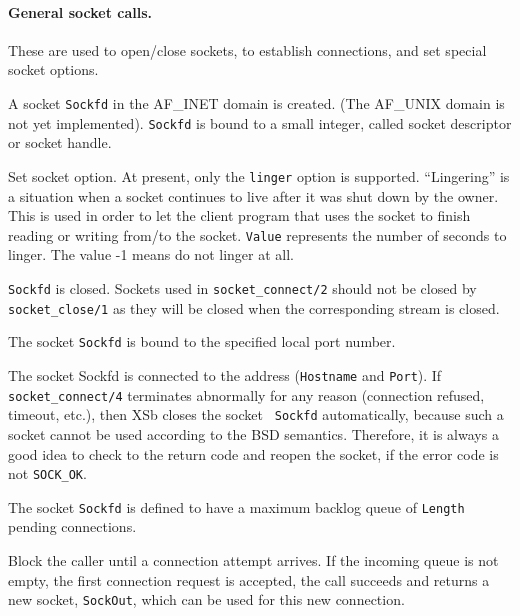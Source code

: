 \paragraph{General socket calls.}
These are used to open/close sockets, to establish connections, and set
special socket options.
\begin{description}
    A socket {\tt Sockfd}  in the AF\_INET domain is created.
    (The AF\_UNIX domain is not yet implemented). 
    {\tt Sockfd} is bound to a small integer, called socket descriptor or
    socket handle.

    Set socket option. At present, only the {\tt linger} option is
    supported. ``Lingering'' is a situation when a socket continues to live
    after it was shut down by the owner. This is used in order to let the
    client program that uses the socket to finish reading or writing
    from/to the socket. {\tt Value} represents the number of seconds to linger.
    The value -1 means do not linger at all.

    {\tt Sockfd} is closed. Sockets used in {\tt socket\_connect/2}  should
    not be closed by {\tt socket\_close/1}  as they will be closed when the
    corresponding stream is closed.

   The socket {\tt Sockfd}  is bound to the specified local port number.

    The socket Sockfd is connected to the address ({\tt Hostname}  and
{\tt Port}). If {\tt socket\_connect/4} terminates abnormally for any reason
(connection refused, timeout, etc.), then XSb closes the socket {\tt
    Sockfd} automatically, because such a socket cannot be used according
    to the BSD semantics. Therefore, it is always a good idea to check to
    the return code and reopen the socket, if the error code is not
    {\tt SOCK\_OK}.

    The socket {\tt Sockfd}  is defined to have a maximum backlog queue of
{\tt Length}  pending connections.

    Block the caller until a connection attempt arrives. If the incoming 
    queue is not empty, the first connection request is accepted, the call
    succeeds and returns a new socket, {\tt SockOut}, which can be used for
    this new connection.
\end{description}

